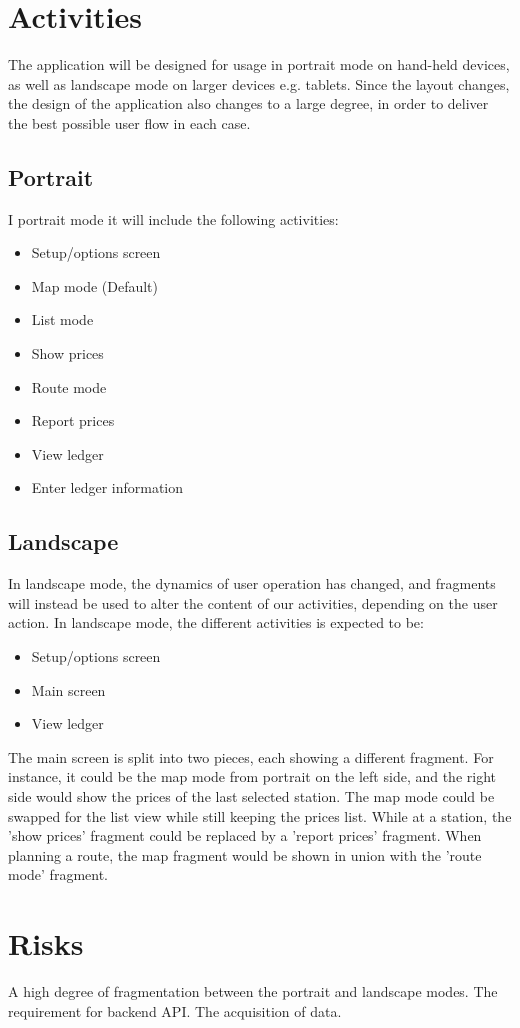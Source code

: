 \section{Activities}
The application will be designed for usage in portrait mode on hand-held devices, as well as landscape mode on larger devices e.g. tablets. Since the layout changes, the design of the application also changes to a large degree, in order to deliver the best possible user flow in each case.

\subsection{Portrait}
I portrait mode it will include the following activities:
\begin{itemize}
	\item Setup/options screen
	\item Map mode (Default)
	\item List mode
	\item Show prices
	\item Route mode
	\item Report prices
	\item View ledger
	\item Enter ledger information
\end{itemize}

\subsection{Landscape}
In landscape mode, the dynamics of user operation has changed, and fragments will instead be used to alter the content of our activities, depending on the user action. In landscape mode, the different activities is expected to be:
\begin{itemize}
	\item Setup/options screen
	\item Main screen
	\item View ledger
\end{itemize}

The main screen is split into two pieces, each showing a different fragment. For instance, it could be the map mode from portrait on the left side, and the right side would show the prices of the last selected station. The map mode could be swapped for the list view while still keeping the prices list. While at a station, the 'show prices' fragment could be replaced by a 'report prices' fragment. When planning a route, the map fragment would be shown in union with the 'route mode' fragment.

\section{Risks}
A high degree of fragmentation between the portrait and landscape modes.
The requirement for backend API.
The acquisition of data.